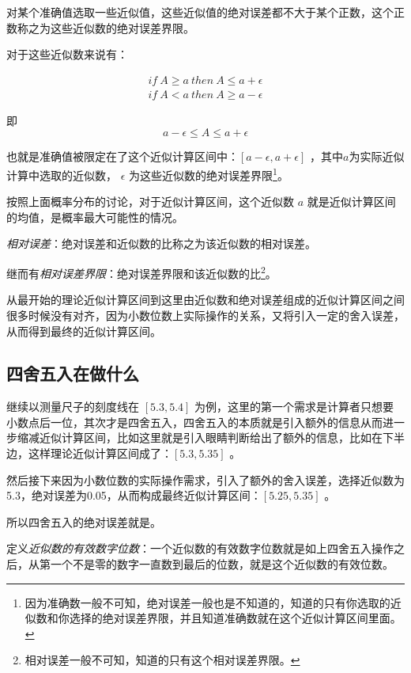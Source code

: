 \documentclass[12pt,oneside]{book}
\begin{document}
对某个准确值选取一些近似值，这些近似值的绝对误差都不大于某个正数，这个正数称之为这些近似数的绝对误差界限。

对于这些近似数来说有：

\begin{align*}
if \ A \geqslant a \ then \ A \leqslant a + \epsilon  \\
if \ A < a \ then \ A \geqslant a - \epsilon
\end{align*}

即
\begin{equation}
\label{eq:6.3}
a - \epsilon \leqslant A \leqslant a + \epsilon
\end{equation}

也就是准确值被限定在了这个近似计算区间中：$ [a-\epsilon, a+\epsilon] $ ，其中$ a $为实际近似计算中选取的近似数， $ \epsilon $ 为这些近似数的绝对误差界限\footnote{因为准确数一般不可知，绝对误差一般也是不知道的，知道的只有你选取的近似数和你选择的绝对误差界限，并且知道准确数就在这个近似计算区间里面。}。

按照上面概率分布的讨论，对于近似计算区间，这个近似数 $ a $ 就是近似计算区间的均值，是概率最大可能性的情况。

\emph{相对误差}：绝对误差和近似数的比称之为该近似数的相对误差。

继而有\emph{相对误差界限}：绝对误差界限和该近似数的比\footnote{相对误差一般不可知，知道的只有这个相对误差界限。}。

从最开始的理论近似计算区间到这里由近似数和绝对误差组成的近似计算区间之间很多时候没有对齐，因为小数位数上实际操作的关系，又将引入一定的舍入误差，从而得到最终的近似计算区间。

\subsection{四舍五入在做什么}
继续以测量尺子的刻度线在 $[5.3, 5.4]$ 为例，这里的第一个需求是计算者只想要小数点后一位，其次才是四舍五入，四舍五入的本质就是引入额外的信息从而进一步缩减近似计算区间，比如这里就是引入眼睛判断给出了额外的信息，比如在下半边，这样理论近似计算区间成了：$[5.3, 5.35]$ 。

然后接下来因为小数位数的实际操作需求，引入了额外的舍入误差，选择近似数为5.3，绝对误差为0.05，从而构成最终近似计算区间：$ [5.25, 5.35] $ 。

所以四舍五入的绝对误差就是。

定义\emph{近似数的有效数字位数}：一个近似数的有效数字位数就是如上四舍五入操作之后，从第一个不是零的数字一直数到最后的位数，就是这个近似数的有效位数。
\end{document}
